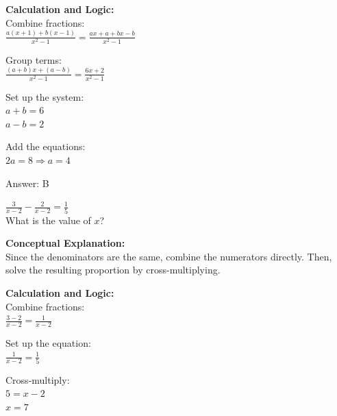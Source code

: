 \documentclass[11pt,paper=a4,answers]{exam}
\begin{document}
\begin{questions}
\begin{solution}
\vspace{20pt}

\textbf{Calculation and Logic:} \\
Combine fractions: \\
$\frac{a(x+1) + b(x-1)}{x^2-1} = \frac{ax + a + bx - b}{x^2-1}$

\vspace{10pt}

Group terms: \\
$\frac{(a+b)x + (a-b)}{x^2-1} = \frac{6x+2}{x^2-1}$

\vspace{10pt}

Set up the system: \\
$a + b = 6$ \\
$a - b = 2$

\vspace{10pt}

Add the equations: \\
$2a = 8 \Rightarrow a = 4$

\vspace{25pt}

Answer: \colorbox{yellow!100}{B}
\end{solution}

\vspace{40pt}

\question
$\frac{3}{x-2} - \frac{2}{x-2} = \frac{1}{5}$ \\
What is the value of $x$?

\begin{solution}
\textbf{Conceptual Explanation:} \\
Since the denominators are the same, combine the numerators directly. Then, solve the resulting proportion by cross-multiplying.

\vspace{20pt}

\textbf{Calculation and Logic:} \\
Combine fractions: \\
$\frac{3-2}{x-2} = \frac{1}{x-2}$

\vspace{10pt}

Set up the equation: \\
$\frac{1}{x-2} = \frac{1}{5}$

\vspace{10pt}

Cross-multiply: \\
$5 = x - 2$ \\
$x = 7$


\end{solution}
\end{questions}
\end{document}
